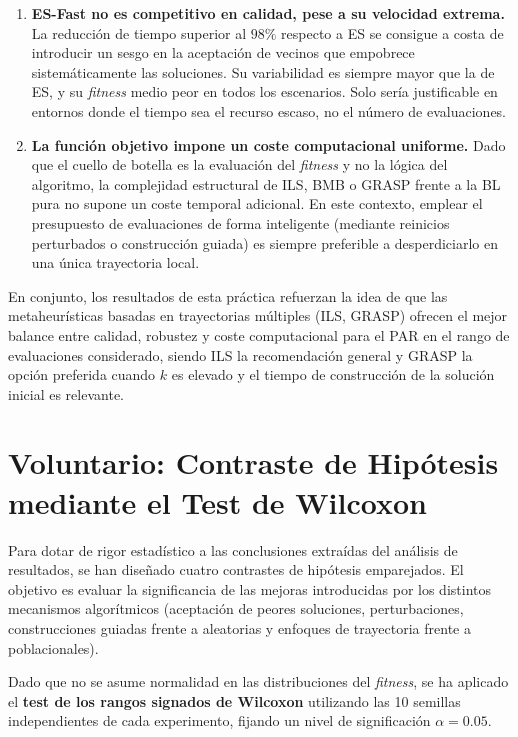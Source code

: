 \documentclass[a4paper,12pt]{article}%
\begin{document}
\begin{enumerate}
	\item \textbf{ES-Fast no es competitivo en calidad, pese a su velocidad extrema.} La reducción de tiempo superior al $98\%$ respecto a ES se consigue a costa de introducir un sesgo en la aceptación de vecinos que empobrece sistemáticamente las soluciones. Su variabilidad es siempre mayor que la de ES, y su \textit{fitness} medio peor en todos los escenarios. Solo sería justificable en entornos donde el tiempo sea	el recurso escaso, no el número de evaluaciones.
	
	\item \textbf{La función objetivo impone un coste computacional uniforme.} Dado que el cuello de botella es la evaluación del \textit{fitness} y no la lógica del algoritmo,	la complejidad estructural de ILS, BMB o GRASP frente a la BL pura no supone un coste temporal adicional. En este contexto, emplear el presupuesto de evaluaciones de forma inteligente (mediante reinicios perturbados o construcción guiada) es siempre preferible a desperdiciarlo en una única trayectoria local.
	
\end{enumerate}

\noindent En conjunto, los resultados de esta práctica refuerzan la idea de que las metaheurísticas basadas en trayectorias múltiples (ILS, GRASP) ofrecen el mejor balance entre calidad, robustez y coste computacional para el PAR en el rango de evaluaciones considerado, siendo ILS la recomendación general y GRASP la opción preferida cuando $k$ es elevado y el tiempo de construcción de la solución inicial es relevante.

\newpage
\section{Voluntario: Contraste de Hipótesis mediante el Test de Wilcoxon}

\noindent Para dotar de rigor estadístico a las conclusiones extraídas del análisis de resultados, se han diseñado cuatro contrastes de hipótesis emparejados. El objetivo es evaluar la significancia de las mejoras introducidas por los distintos mecanismos algorítmicos (aceptación de peores soluciones, perturbaciones, construcciones guiadas frente a aleatorias y enfoques de trayectoria frente a poblacionales). 

Dado que no se asume normalidad en las distribuciones del \textit{fitness}, se ha aplicado el \textbf{test de los rangos signados de Wilcoxon} utilizando las 10 semillas independientes de cada experimento, fijando un nivel de significación $\alpha = 0.05$.
\end{document}
